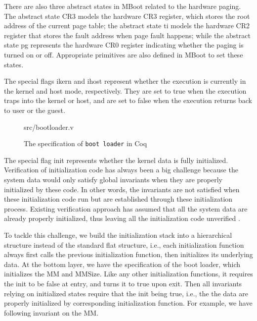There are also three abstract states in MBoot related to the hardware paging.
The abstract state \textsf{CR3} models the hardware \textsf{CR3} register,
which stores the root address of the current page table; the abstract state
\textsf{ti} models the hardware \textsf{CR2} register that stores the fault address
when page fault happens; while the abstract state \textsf{pg} represents
the hardware \textsf{CR0} register indicating whether the paging is turned on or off.
Appropriate primitives are also defined in MBoot to set these states.

The special flags \textsf{ikern} and \textsf{ihost} represent whether the execution
is currently in the kernel and host mode, respectively. They are set to \textsf{true}
when the execution traps into the kernel or host, and are set to \textsf{false} when
the execution returns back to user or the guest.


\begin{figure}
	 {src/bootloader.v}
	\caption{The specification of \texttt{boot loader} in Coq}
	\label{fig:bootloader_v}
\end{figure}

The special flag \textsf{init} represents whether the kernel data is fully initialized.
Verification of initialization code has always been a big challenge because the system
data would only satisfy global invariants when they are properly initialized by these code.
In other words, the invariants are not satisfied when these initialization code run but
are established through these initialization process. Existing verification approach
has assumed that all the system data are already properly initialized, thus leaving
all the initialization code unverified \cite{klein2009sel4,klein14}.

To tackle this challenge, we build the initialization stack into a hierarchical structure
instead of the standard flat structure, i.e., each initialization function always first calls
the previous initialization function, then initializes its underlying data. At the bottom layer,
we have the specification of the boot loader, which initializes the \textsf{MM} and \textsf{MMSize}.
Like any other initialization functions, it requires the \textsf{init} to be \textsf{false} at entry, and turns
it to \textsf{true} upon exit. Then all invariants relying on initialized states require that the \textsf{init}
being \textsf{true}, i.e., the the data are properly initialized by corresponding initialization function.
For example, we have following invariant on the \textsf{MM}.

